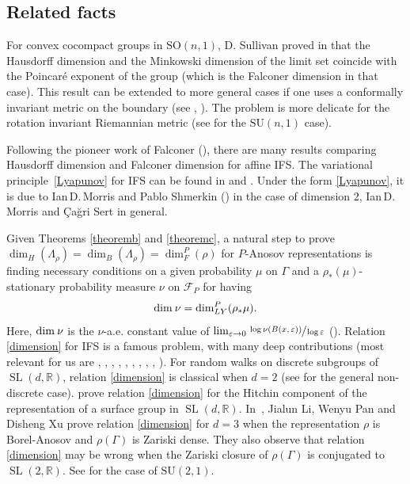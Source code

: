 \documentclass[JEP,XML,SOM,Unicode,NoEqCountersInSection,published]{cedram}
\newcommand{\NoChangel}[1]{%
\expandafter\let\csname old\string#1\endcsname=#1
\let#1=\relax
\newcommand{#1}{\mathop{\mathcode`l="716C\csname old\string#1\endcsname\mathcode`l="7160}\displaylimits}%
}
\newcommand{\loc}{\mathrm{loc}}\NoChangel{\loc}
\newcommand{\R}{\mathbb{R}}
\newcommand{\F}{\mathcal{F}}
\let\e\varepsilon
\let\G\Gamma
\let\La\Lambda
\DeclareMathOperator{\SL}{SL}
\begin{document}
\subsection{Related facts}
For convex cocompact groups in \({\textrm {SO}}(n,1)\), D. Sullivan proved in \cite{Sul79} that the Hausdorff dimension and the Minkowski dimension of the limit set coincide with the Poincaré exponent of the group (which is the Falconer dimension in that case). This result can be extended to more general cases if one uses a conformally invariant metric on the boundary (see \cite{Lin04}, \cite{DK22}). The problem is more delicate for the rotation invariant Riemannian metric (see \eg \cite{Duf17} for the \({\textrm {SU}}(n,1)\) case).

Following the pioneer work of Falconer (\cite{Fal88}), there are many results comparing Hausdorff dimension and Falconer dimension for affine IFS. The variational principle~\eqref{Lyapunov} for IFS can be found in \cite{Fal88} and \cite{K04}. Under the form \eqref{Lyapunov}, it is due to \hbox{Ian\,D.\,Morris} and Pablo Shmerkin (\cite{MS19}) in the case of dimension 2, \hbox{Ian\,D.\,Morris} and \c Ca\u{g}ri Sert \cite{MS21} in general.

Given Theorems \ref{theoremb} and \ref{theoremc}, a natural step to prove \(\dim_H (\La_\rho) = \dim_B (\La_\rho) = \dim_F^P (\rho) \) for \(P\)-Anosov representations is finding necessary conditions on a given probability \(\mu \) on \(\G\) and a \(\rho_\ast (\mu)\)-stationary probability measure \(\nu \) on \(\F_{P}\) for having
\begin{equation}\label{dimension} \dim_{\loc} \nu = \dim_{LY}^P (\rho_\ast \mu).\end{equation}
Here, \(\dim_{\loc} \nu \) is the \(\nu \)-a.e. constant value of \(\lim_{\e \to 0} \sfrac{\log \nu (B(x,\e))}{\log \e} \) (\cf \cite{LL23}). Relation \eqref{dimension} for IFS is a famous problem, with many deep contributions (most relevant for us are \cite{Fal88}, \cite{JPS07}, \cite{Hoc14}, \cite{BV19}, \cite{Var19}, \cite{BHR19}, \cite{HR19}, \cite{FS22}, \cite{Rap22}, \cite{MS21}). For random walks on discrete subgroups of \(\SL (d,\R) \), relation \eqref{dimension} is classical when \(d=2\) (see \cite{HS17} for the general non-discrete case). \cite{LL23a} prove relation \eqref{dimension} for the Hitchin component of the representation of a surface group in \(\SL (d,\R)\). In~\cite{LPX23}, Jialun Li, Wenyu Pan and Disheng Xu prove relation \eqref{dimension} for \(d=3\) when the representation \(\rho \) is Borel-Anosov and \(\rho (\G)\) is Zariski dense. They also observe that relation \eqref{dimension} may be wrong when the Zariski closure of \(\rho (\G) \) is conjugated to \(\SL(2, \R)\). See \cite{DS22} for the case of \({\textrm {SU}}(2,1)\).
\end{document}
